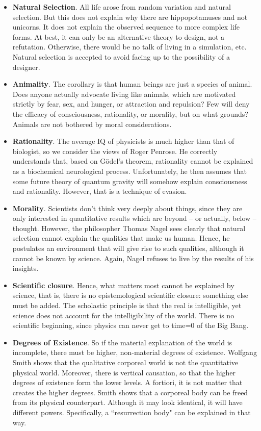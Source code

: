 \begin{itemize}
\item \textbf{Natural Selection}. All life arose from random variation and natural selection. But this does not explain why there are hippopotamuses and not unicorns. It does not explain the observed sequence to more complex life forms. At best, it can only be an alternative theory to design, not a refutation. Otherwise, there would be no talk of living in a simulation, etc. Natural selection is accepted to avoid facing up to the possibility of a designer. 
\item \textbf{Animality}. The corollary is that human beings are just a species of animal. Does anyone actually advocate living like animals, which are motivated strictly by fear, sex, and hunger, or attraction and repulsion? Few will deny the efficacy of consciousness, rationality, or morality, but on what grounds? Animals are not bothered by moral considerations. 
\item \textbf{Rationality}. The average IQ of physicists is much higher than that of biologist, so we consider the views of Roger Penrose. He correctly understands that, based on Gödel's theorem, rationality cannot be explained as a biochemical neurological process. Unfortunately, he then assumes that some future theory of quantum gravity will somehow explain consciousness and rationality. However, that is a technique of evasion. 
\item \textbf{Morality}. Scientists don't think very deeply about things, since they are only interested in quantitative results which are beyond – or actually, below – thought. However, the philosopher Thomas Nagel sees clearly that natural selection cannot explain the qualities that make us human. Hence, he postulates an environment that will give rise to such qualities, although it cannot be known by science. Again, Nagel refuses to live by the results of his insights. 
\item \textbf{Scientific closure}. Hence, what matters most cannot be explained by science, that is, there is no epistemological scientific closure: something else must be added. The scholastic principle is that the real is intelligible, yet science does not account for the intelligibility of the world. There is no scientific beginning, since physics can never get to time=0 of the Big Bang. 
\item \textbf{Degrees of Existence}. So if the material explanation of the world is incomplete, there must be higher, non-material degrees of existence. Wolfgang Smith shows that the qualitative corporeal world is not the quantitative physical world. Moreover, there is vertical causation, so that the higher degrees of existence form the lower levels. A fortiori, it is not matter that creates the higher degrees. Smith shows that a corporeal body can be freed from its physical counterpart. Although it may look identical, it will have different powers. Specifically, a ``resurrection body" can be explained in that way. 
\end{itemize}
